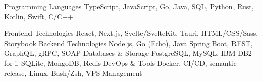 

\begin{cvskills}

  \cvskill
    {Programming Languages} %
    {TypeScript, JavaScript, Go, Java, SQL, Python, Rust, Kotlin, Swift, C/C++} %

  \cvskill
    {Frontend Technologies} %
    {React, Next.js, Svelte/SvelteKit, Tauri, HTML/CSS/Sass, Storybook} %
  \cvskill
    {Backend Technologies} %
    {Node.js, Go (Echo), Java Spring Boot, REST, GraphQL, gRPC, SOAP} %
  \cvskill
    {Databases \& Storage} %
    {PostgreSQL, MySQL, IBM DB2 for i, SQLite, MongoDB, Redis} %
  \cvskill
    {DevOps \& Tools} %
    {Docker, CI/CD, semantic-release, Linux, Bash/Zsh, VPS Management} %

\end{cvskills}
